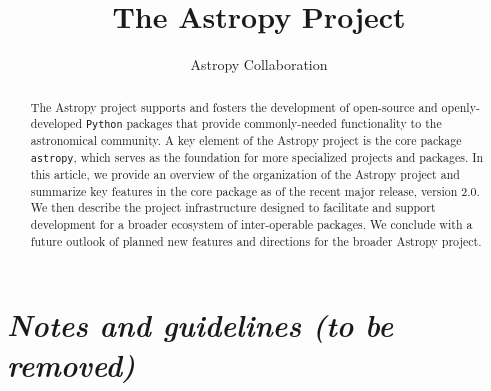 \documentclass[modern]{aastex61}
\newcommand{\package}[1]{\texttt{#1}\xspace}
\newcommand{\python}{\package{Python}}
\newcommand{\astropy}{Astropy\xspace}
\newcommand{\astropypkg}{\package{astropy}}
\begin{document}
\draft{\today}

\title{The Astropy Project}


\author{Astropy Collaboration}

\begin{abstract}
The \astropy project supports and fosters the development of open-source and openly-developed
\python packages that provide commonly-needed functionality to the astronomical
community.
A key element of the \astropy project is the core package \astropypkg, which serves as the
foundation for more specialized projects and packages.
In this article, we provide an overview of the organization of the \astropy
project and summarize key features in the core package as of the recent major
release, version 2.0.
We then describe the project infrastructure designed to facilitate and support
development for a broader ecosystem of inter-operable packages.
We conclude with a future outlook of planned new features and directions for the
broader \astropy project.
\end{abstract}


\section*{\textit{Notes and guidelines (to be removed)}}
\end{document}
